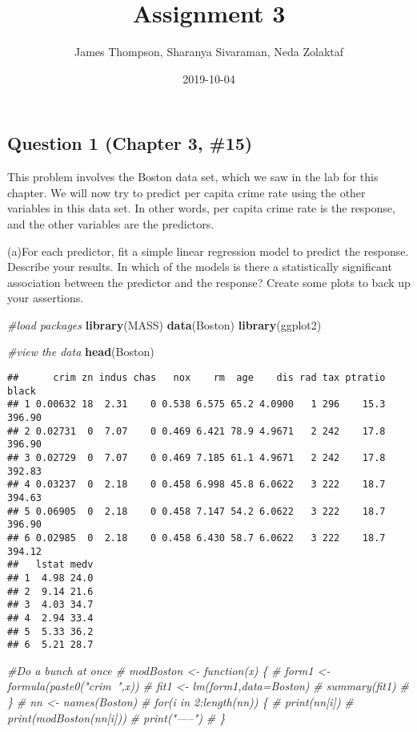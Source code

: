 \documentclass[]{article}
\title{Assignment 3}
\author{James Thompson, Sharanya Sivaraman, Neda Zolaktaf}
\date{2019-10-04}
\newenvironment{Shaded}{\begin{snugshade}}{\end{snugshade}}
\newcommand{\CommentTok}[1]{\textcolor[rgb]{0.56,0.35,0.01}{\textit{#1}}}
\newcommand{\KeywordTok}[1]{\textcolor[rgb]{0.13,0.29,0.53}{\textbf{#1}}}
\newcommand{\NormalTok}[1]{#1}
\begin{document}
\maketitle

\hypertarget{question-1-chapter-3-15}{%
\subsection{Question 1 (Chapter 3,
\#15)}\label{question-1-chapter-3-15}}

This problem involves the Boston data set, which we saw in the lab for
this chapter. We will now try to predict per capita crime rate using the
other variables in this data set. In other words, per capita crime rate
is the response, and the other variables are the predictors.

(a)For each predictor, fit a simple linear regression model to predict
the response. Describe your results. In which of the models is there a
statistically significant association between the predictor and the
response? Create some plots to back up your assertions.

\begin{Shaded}
\begin{Highlighting}[]
\CommentTok{#load packages}
\KeywordTok{library}\NormalTok{(MASS)}
\KeywordTok{data}\NormalTok{(Boston)}
\KeywordTok{library}\NormalTok{(ggplot2)}

\CommentTok{#view the data}
\KeywordTok{head}\NormalTok{(Boston)}
\end{Highlighting}
\end{Shaded}

\begin{verbatim}
##      crim zn indus chas   nox    rm  age    dis rad tax ptratio  black
## 1 0.00632 18  2.31    0 0.538 6.575 65.2 4.0900   1 296    15.3 396.90
## 2 0.02731  0  7.07    0 0.469 6.421 78.9 4.9671   2 242    17.8 396.90
## 3 0.02729  0  7.07    0 0.469 7.185 61.1 4.9671   2 242    17.8 392.83
## 4 0.03237  0  2.18    0 0.458 6.998 45.8 6.0622   3 222    18.7 394.63
## 5 0.06905  0  2.18    0 0.458 7.147 54.2 6.0622   3 222    18.7 396.90
## 6 0.02985  0  2.18    0 0.458 6.430 58.7 6.0622   3 222    18.7 394.12
##   lstat medv
## 1  4.98 24.0
## 2  9.14 21.6
## 3  4.03 34.7
## 4  2.94 33.4
## 5  5.33 36.2
## 6  5.21 28.7
\end{verbatim}

\begin{Shaded}
\begin{Highlighting}[]
\CommentTok{#Do a bunch at once}
\CommentTok{# modBoston <- function(x) \{}
\CommentTok{#   form1 <- formula(paste0("crim~",x))}
\CommentTok{#   fit1 <- lm(form1,data=Boston)}
\CommentTok{#   summary(fit1)}
\CommentTok{# \}}
\CommentTok{# nn <- names(Boston)}
\CommentTok{# for(i in 2:length(nn)) \{}
\CommentTok{#   print(nn[i])}
\CommentTok{#   print(modBoston(nn[i]))}
\CommentTok{#   print("-----")}
\CommentTok{# \}}
\end{Highlighting}
\end{Shaded}
\end{document}
